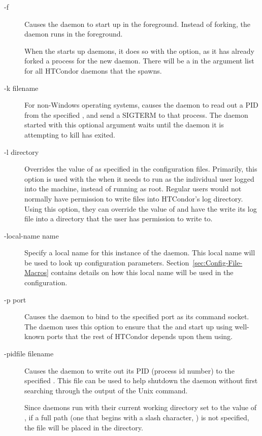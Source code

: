 \begin{description}
\item[-f] Causes the daemon to start up in the foreground.  Instead of
  forking, the daemon runs in the foreground.  

  \Note When the  starts up daemons, it does
  so with the  option, as it has already forked a process for the
  new daemon.  There will be a  in the argument list for all
  HTCondor daemons that the  spawns.

\item[-k filename] For non-Windows operating systems,
  causes the daemon to read out a PID from the
  specified , and send a SIGTERM to that process.
  The daemon started with this optional argument waits until the
  daemon it is attempting to kill has exited.  

\item[-l directory] Overrides the value of  as specified in
  the configuration files.  Primarily, this option is used with the
   when it needs to run as the individual user logged
  into the machine, instead of running as root.  Regular users would
  not normally have permission to write files into HTCondor's log
  directory.  Using this option, they can override the value of
   and have the  write its log file into a
  directory that the user has permission to write to.

\item[-local-name name] Specify a local name for this instance of
  the daemon.  This local name will be used to look up
  configuration parameters. 
  Section~\ref{sec:Config-File-Macros} contains
  details on how this local name will be used in the configuration.

\item[-p port] Causes the daemon to bind to the specified port as its
  command socket.  The  daemon
  uses this option to ensure that the
   and  start up using
  well-known ports that the rest of HTCondor depends upon them using.

\item[-pidfile filename] Causes the daemon to write out its PID
  (process id number) to the specified .
  This file can be used to
  help shutdown the daemon without first searching through 
  the output of the Unix  command.

  Since daemons run with their current working directory set to the
  value of , if a full path 
  (one that begins with a slash character, \Expr{/})
  is not specified,
  the file will be placed in the  directory.


\end{description}
